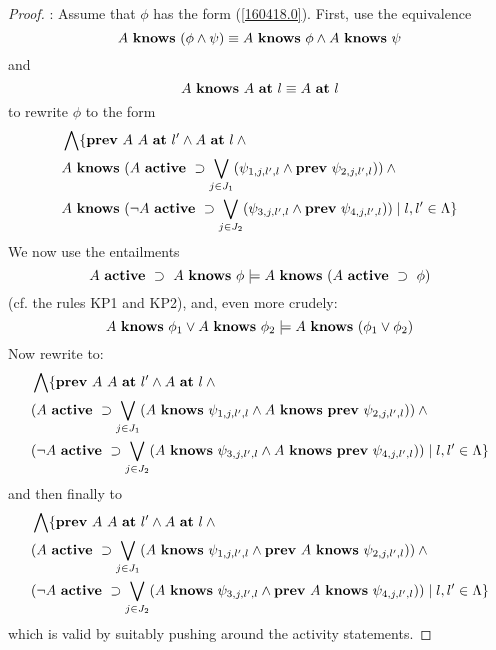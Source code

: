\begin{proof}
\noindent{}: Assume that  $\phi$ has the form (\ref{160418.0}). First, use the equivalence
\begin{equation*}
A\ \Knows\ (\phi\wedge \psi) \equiv A\ \Knows\ \phi\wedge A\ \Knows\ \psi
\end{equation*}
and
\begin{equation*}
A\ \Knows\ A\ \At\ \Label \equiv A\ \At\ \Label
\end{equation*}
to rewrite $\phi$ to the form
%
\begin{eqnarray*}
 & \bigwedge\{\mathbf{prev}\ A\ A\ \mathbf{at}\ l' \wedge A\ \mathbf{at}\ l \wedge \mbox{} \nonumber \\
 & A\ \mathbf{knows}\ (A\ \mathbf{active}\ \supset \bigvee_{j\in J_1}(\psi_{1,j,l',l} \wedge \mathbf{prev}\ \psi_{2,j,l',l})) \wedge \mbox{} \nonumber \\ 
 & A\ \mathbf{knows}\ (\neg A\ \mathbf{active}\ \supset \bigvee_{j\in J_2}(\psi_{3,j,l',l} \wedge \mathbf{prev}\ \psi_{4,j,l',l})) \mid l,l'\in\Lambda\} \label{160418.1}
\end{eqnarray*}
%
We now use the entailments
\begin{equation*}
\label{160419.1}
A\ \Active\ \Implies\ A\ \Knows\ \phi \models A\ \Knows\ (A\ \Active\ \Implies\ \phi)
\end{equation*}
(cf. the rules {\sc KP1} and {\sc KP2}),
and, even more crudely:
\begin{equation*}
A\ \mathbf{knows}\ \phi_1 \vee A\ \mathbf{knows}\ \phi_2 \models A\ \mathbf{knows}\ (\phi_1\vee \phi_2) 
\end{equation*}
Now rewrite to:
%
\begin{eqnarray*}
 & \bigwedge\{\Prev\ A\ A\ \At\ \Label' \wedge A\ \At\ \Label \wedge \mbox{} \nonumber \\
 & (A\ \Active\ \Implies \bigvee_{j\in J_1}(A\ \Knows\ \psi_{1,j,\Label',\Label} \wedge A\ \Knows\ \Prev\ \psi_{2,j,\Label',\Label})) \wedge \mbox{} \nonumber \\ 
 & (\neg A\ \Active\ \Implies \bigvee_{j\in J_2}(A\ \Knows\ \psi_{3,j,\Label',\Label} \wedge A\ \Knows\ \Prev\ \psi_{4,j,\Label',\Label})) \mid \Label,\Label'\in\Labels\} \label{160418.1}
\end{eqnarray*}
%
and then finally to
\begin{eqnarray*}
 & \bigwedge\{\Prev\ A\ A\ \At\ \Label' \wedge A\ \At\ \Label \wedge \mbox{} \nonumber \\
 & (A\ \Active\ \Implies \bigvee_{j\in J_1}(A\ \Knows\ \psi_{1,j,\Label',\Label} \wedge \Prev\ A\ \Knows\ \psi_{2,j,\Label',\Label})) \wedge \mbox{} \nonumber \\ 
 & (\neg A\ \Active\ \Implies \bigvee_{j\in J_2}(A\ \Knows\ \psi_{3,j,\Label',\Label} \wedge \Prev\ A\ \Knows\ \psi_{4,j,\Label',\Label})) \mid \Label,\Label'\in\Labels\} \label{160418.1}
\end{eqnarray*}
%
which is valid by suitably pushing around the activity statements.


\end{proof}
